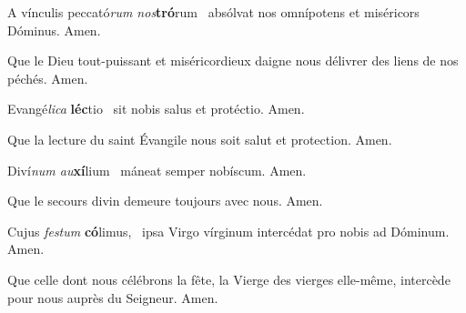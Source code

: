 \documentclass[psautier_nocturne_fr.tex]{subfiles}
\begin{document}



\begin{paracol}{2}

A vínculis peccató\textit{rum nos}\textbf{tró}rum~\GreSpecial{*}
absólvat nos omnípotens et miséricors Dóminus.
\hspace{\specialcharhsep}\rr Amen.

\switchcolumn

Que le Dieu tout-puissant et miséricordieux daigne nous délivrer des liens de nos péchés.
\hspace{\specialcharhsep}\rr Amen.

\end{paracol}


\begin{paracol}{2}

Evangé\textit{lica} \textbf{léc}tio~\GreSpecial{*}
sit nobis salus et protéctio.
\hspace{\specialcharhsep}\rr Amen.

\switchcolumn

Que la lecture du saint Évangile nous soit salut et protection.
\hspace{\specialcharhsep}\rr Amen.

\end{paracol}


\begin{paracol}{2}

Diví\textit{num au}\textbf{xí}lium~\GreSpecial{*}
máneat semper nobíscum.
\hspace{\specialcharhsep}\rr Amen.

\switchcolumn

Que le secours divin demeure toujours avec nous.
\hspace{\specialcharhsep}\rr Amen.

\end{paracol}


\begin{paracol}{2}

Cujus \textit{festum} \textbf{có}limus,~\GreSpecial{*}
ipsa Virgo vírginum intercédat pro nobis ad Dóminum.
\hspace{\specialcharhsep}\rr Amen.

\switchcolumn

Que celle dont nous célébrons la fête, la Vierge des vierges elle-même, intercède pour nous auprès du Seigneur.
\hspace{\specialcharhsep}\rr Amen.

\end{paracol}
\end{document}
